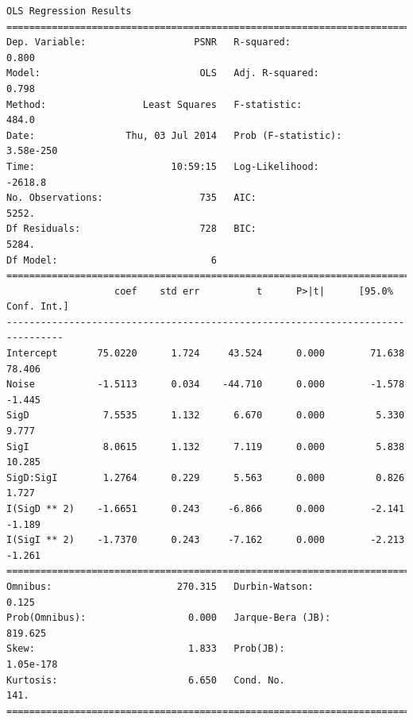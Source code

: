 \documentclass[11pt]{article}
\theoremstyle{definition}
\begin{document}
{\footnotesize
\begin{lstlisting}[caption = Time Series 1 - Bilateral Filter OLS Model, label = {bilateralfilterseries1}]
                            OLS Regression Results                            
==============================================================================
Dep. Variable:                   PSNR   R-squared:                       0.800
Model:                            OLS   Adj. R-squared:                  0.798
Method:                 Least Squares   F-statistic:                     484.0
Date:                Thu, 03 Jul 2014   Prob (F-statistic):          3.58e-250
Time:                        10:59:15   Log-Likelihood:                -2618.8
No. Observations:                 735   AIC:                             5252.
Df Residuals:                     728   BIC:                             5284.
Df Model:                           6                                         
================================================================================
                   coef    std err          t      P>|t|      [95.0% Conf. Int.]
--------------------------------------------------------------------------------
Intercept       75.0220      1.724     43.524      0.000        71.638    78.406
Noise           -1.5113      0.034    -44.710      0.000        -1.578    -1.445
SigD             7.5535      1.132      6.670      0.000         5.330     9.777
SigI             8.0615      1.132      7.119      0.000         5.838    10.285
SigD:SigI        1.2764      0.229      5.563      0.000         0.826     1.727
I(SigD ** 2)    -1.6651      0.243     -6.866      0.000        -2.141    -1.189
I(SigI ** 2)    -1.7370      0.243     -7.162      0.000        -2.213    -1.261
==============================================================================
Omnibus:                      270.315   Durbin-Watson:                   0.125
Prob(Omnibus):                  0.000   Jarque-Bera (JB):              819.625
Skew:                           1.833   Prob(JB):                    1.05e-178
Kurtosis:                       6.650   Cond. No.                         141.
==============================================================================
\end{lstlisting}

}
\end{document}
